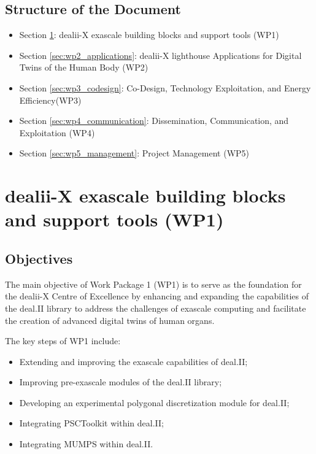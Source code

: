 \documentclass[a4paper,12pt, numbers]{article}
\begin{document}
	\subsection{{Structure of the Document}}
	\begin{itemize}
		\item Section \ref{sec:wp1_dealii}: dealii-X exascale building blocks and support tools (WP1)
		\item Section \ref{sec:wp2_applications}: dealii-X lighthouse Applications for Digital Twins of the Human Body (WP2)
		\item Section \ref{sec:wp3_codesign}: Co-Design, Technology Exploitation, and Energy Efficiency(WP3)
		\item Section \ref{sec:wp4_communication}: Dissemination, Communication, and Exploitation (WP4)
		\item Section \ref{sec:wp5_management}: Project Management (WP5)
	\end{itemize}
	
	\newpage
	
	\section{{dealii-X exascale building blocks and support tools (WP1)}}
	\label{sec:wp1_dealii}
	
	\subsection{Objectives}
	
	The main objective of Work Package 1 (WP1) is to serve as the foundation
	for the dealii-X Centre of Excellence by enhancing and expanding the
	capabilities of the deal.II library to address the challenges of exascale
	computing and facilitate the creation of advanced digital twins of human
	organs.
	
	The key steps of WP1 include:
	\begin{itemize}
		\item Extending and improving the exascale capabilities of deal.II;
		\item Improving pre-exascale modules of the deal.II library;
		\item Developing an experimental polygonal discretization module for deal.II;
		\item Integrating PSCToolkit within deal.II;
		\item Integrating MUMPS within deal.II.
	\end{itemize}
	
\end{document}
